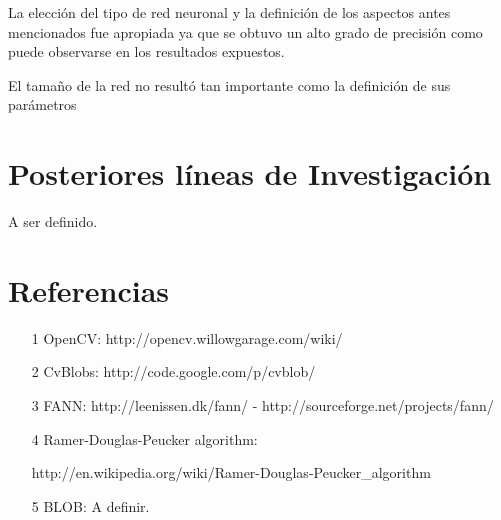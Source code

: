 \documentclass[pdftex,a4paper,12pt]{article}
\begin{document}
	La elecci\'on del tipo de red neuronal y la definici\'on de los aspectos antes mencionados
	fue apropiada ya que se obtuvo un alto grado de precisi\'on como puede observarse
	en los resultados expuestos.
	
	El tama\~no de la red no result\'o tan importante como la definici\'on de sus par\'ametros

\section{Posteriores l\'ineas de Investigaci\'on} %
A ser definido.

\newpage
\section{Referencias} %
\begin{itemize}
  \item [1] OpenCV: http://opencv.willowgarage.com/wiki/
  \item [2] CvBlobs: http://code.google.com/p/cvblob/
  \item [3] FANN: http://leenissen.dk/fann/ - http://sourceforge.net/projects/fann/
  \item [4] Ramer-Douglas-Peucker algorithm: 

  		http://en.wikipedia.org/wiki/Ramer-Douglas-Peucker\_algorithm
  \item [5] BLOB: A definir.
\end{itemize}



\end{document}
